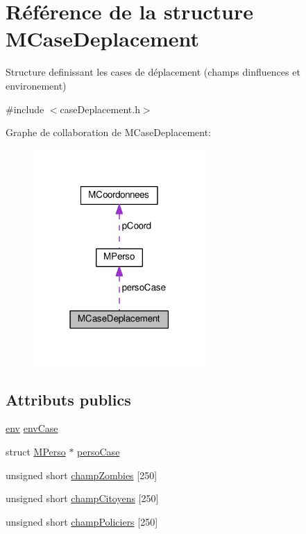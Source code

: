 \hypertarget{structMCaseDeplacement}{}\section{Référence de la structure M\+Case\+Deplacement}
\label{structMCaseDeplacement}


Structure definissant les cases de déplacement (champs d\textquotesingle{}influences et environement)  




{\ttfamily \#include $<$case\+Deplacement.\+h$>$}



Graphe de collaboration de M\+Case\+Deplacement\+:\nopagebreak
\begin{figure}[H]
\begin{center}
\leavevmode
\includegraphics[width=186pt]{structMCaseDeplacement__coll__graph}
\end{center}
\end{figure}
\subsection*{Attributs publics}
\begin{DoxyCompactItemize}
\item 
\hyperlink{caseDeplacement_8h_af9a4f51a2aa1485342c48472a9124d83}{env} \hyperlink{structMCaseDeplacement_a39fe908c7afa0eb210c77d12bb96a99e}{env\+Case}
\item 
struct \hyperlink{structMPerso}{M\+Perso} $\ast$ \hyperlink{structMCaseDeplacement_a4c1dce63d49728610cc667865d0661e2}{perso\+Case}
\item 
unsigned short \hyperlink{structMCaseDeplacement_a3507b4494325ec01693f9034eed8f681}{champ\+Zombies} \mbox{[}250\mbox{]}
\item 
unsigned short \hyperlink{structMCaseDeplacement_a992e7ffc50e45a8fb49a982dcc392aa8}{champ\+Citoyens} \mbox{[}250\mbox{]}
\item 
unsigned short \hyperlink{structMCaseDeplacement_a98792df104a1bbab569aa9d0a86af554}{champ\+Policiers} \mbox{[}250\mbox{]}
\end{DoxyCompactItemize}


